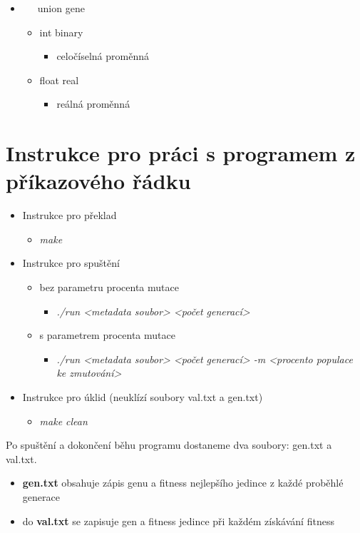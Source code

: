 \documentclass{article}
\begin{document}
\begin{itemize}
\item  \ \ \ union gene
\begin{itemize}
\item int binary
\begin{itemize}
\item celočíselná proměnná
\end{itemize}
\item float real
\begin{itemize}
\item reálná proměnná
\end{itemize}
\end{itemize}
\end{itemize}


\section{Instrukce pro práci s programem z příkazového řádku}
\begin{itemize}
\item Instrukce pro překlad
\begin{itemize}
\item \textit{make}
\end{itemize}
\item Instrukce pro spuštění
\begin{itemize}
\item bez parametru procenta mutace
\begin{itemize}
\item \textit{./run <metadata soubor> <počet generací>}
\end{itemize}
\item s parametrem procenta mutace
\begin{itemize}
\item \textit{./run <metadata soubor> <počet generací> -m <procento populace ke zmutování>}
\end{itemize}
\end{itemize}
\item Instrukce pro úklid (neuklízí soubory val.txt a gen.txt)
\begin{itemize}
\item \textit{make clean}
\end{itemize}
\end{itemize}



Po spuštění a dokončení běhu programu dostaneme dva soubory: gen.txt a val.txt. 
\begin{itemize}
\item \textbf{gen.txt} obsahuje zápis genu a fitness nejlepšího jedince z každé proběhlé generace
\item do \textbf{val.txt} se zapisuje gen a fitness jedince při každém získávání fitness
\end{itemize}
\end{document}

